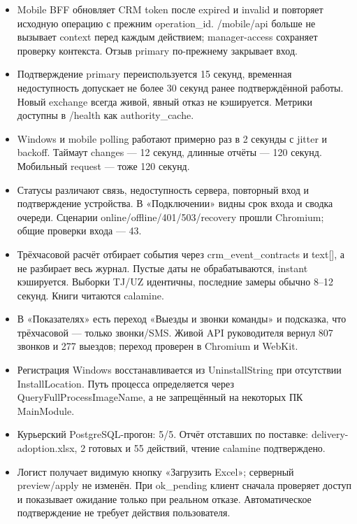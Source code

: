 \documentclass[12pt,a4paper]{article}
\begin{document}
\begin{itemize}
\item Mobile BFF обновляет CRM token после expired и invalid и повторяет исходную операцию с прежним operation\_id. {\small\ttfamily /\allowbreak{}mobile/\allowbreak{}api} больше не вызывает {\small\ttfamily context} перед каждым действием; manager-access сохраняет проверку контекста. Отзыв primary по-прежнему закрывает вход.
\item Подтверждение primary переиспользуется 15 секунд, временная недоступность допускает не более 30 секунд ранее подтверждённой работы. Новый exchange всегда живой, явный отказ не кэшируется. Метрики доступны в {\small\ttfamily /\allowbreak{}health} как {\small\ttfamily authority\_\allowbreak{}cache}.
\item Windows и mobile polling работают примерно раз в 2 секунды с jitter и backoff. Таймаут {\small\ttfamily changes} — 12 секунд, длинные отчёты — 120 секунд. Мобильный request — тоже 120 секунд.
\item Статусы различают связь, недоступность сервера, повторный вход и подтверждение устройства. В «Подключении» видны срок входа и сводка очереди. Сценарии online/offline/401/503/recovery прошли Chromium; общие проверки входа — 43.
\item Трёхчасовой расчёт отбирает события через {\small\ttfamily crm\_\allowbreak{}event\_\allowbreak{}contracts} и {\small\ttfamily text[]}, а не разбирает весь журнал. Пустые даты не обрабатываются, {\small\ttfamily instant} кэшируется. Выборки TJ/UZ идентичны, последние замеры обычно 8–12 секунд. Книги читаются calamine.
\item В «Показателях» есть переход «Выезды и звонки команды» и подсказка, что трёхчасовой — только звонки/SMS. Живой API руководителя вернул 807 звонков и 277 выездов; переход проверен в Chromium и WebKit.
\item Регистрация Windows восстанавливается из {\small\ttfamily UninstallString} при отсутствии {\small\ttfamily InstallLocation}. Путь процесса определяется через {\small\ttfamily QueryFullProcessImageName}, а не запрещённый на некоторых ПК {\small\ttfamily MainModule}.
\item Курьерский PostgreSQL-прогон: 5/5. Отчёт отставших по поставке: {\small\ttfamily delivery-\allowbreak{}adoption.\allowbreak{}xlsx}, 2 готовых и 55 действий, чтение calamine подтверждено.
\item Логист получает видимую кнопку «Загрузить Excel»; серверный preview/apply не изменён. При {\small\ttfamily ok\_\allowbreak{}pending} клиент сначала проверяет доступ и показывает ожидание только при реальном отказе. Автоматическое подтверждение не требует действия пользователя.
\end{itemize}
\end{document}
